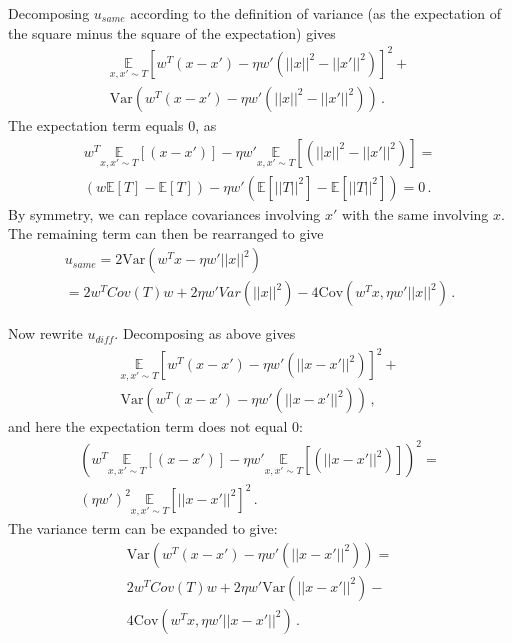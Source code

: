 \documentclass[runningheads]{llncs}
\begin{document}
Decomposing $u_{\mathit{same}}$ according to the definition of variance (as the expectation of the square minus the square of the expectation) gives 
\begin{align*}
\underset{x, x' \sim T}{\mathbb{E}}[w^T(x - x') - \eta w'(||x||^2-||x'||^2)]^2 + \\ \text{Var}(w^T(x - x') - \eta w'(||x||^2-||x'||^2))\,.
\end{align*}
The expectation term equals $0$, as
\begin{gather*}
w^T\underset{x, x' \sim T}{\mathbb{E}}[(x - x')] - \eta w'\underset{x, x' \sim T}{\mathbb{E}}[(||x||^2-||x'||^2)] = \\
(w\mathbb{E}[T] - \mathbb{E}[T]) - \eta w'(\mathbb{E}[||T||^2]-\mathbb{E}[||T||^2]) = 0 \,.
\end{gather*}
By symmetry, we can replace covariances involving $x'$ with the same involving $x$. The remaining term can then be rearranged to give
\begin{gather*}
u_{same} = 2\text{Var}(w^Tx - \eta w'||x||^2) \\
 = 2w^TCov(T)w + 2\eta w' Var(||x||^2) - 4\text{Cov}(w^Tx, \eta w'||x||^2)\,.
\end{gather*}

Now rewrite $u_{\mathit{diff}}$. Decomposing as above gives
\begin{gather*}
\underset{x, x' \sim T}{\mathbb{E}}[w^T(x - x') - \eta w'(||x-x'||^2)]^2 + \\ \text{Var}(w^T(x - x') - \eta w'(||x-x'||^2))\,,
\end{gather*}
and here the expectation term does not equal 0:
\begin{gather*}
(w^T\underset{x, x' \sim T}{\mathbb{E}}[(x - x')] - \eta w'\underset{x, x' \sim T}{\mathbb{E}}[(||x-x'||^2)])^2 = \\
(\eta w')^2\underset{x, x' \sim T}{\mathbb{E}}[||x-x'||^2]^2
\,.
\end{gather*}
The variance term can be expanded to give:
\begin{gather*}
    \text{Var}(w^T(x - x') - \eta w'(||x-x'||^2)) = \\
    2w^TCov(T)w + 2\eta w'\text{Var}(||x - x'||^2) - \\
    4\text{Cov}(w^Tx, \eta w'||x - x'||^2)\,.
\end{gather*}
\end{document}
